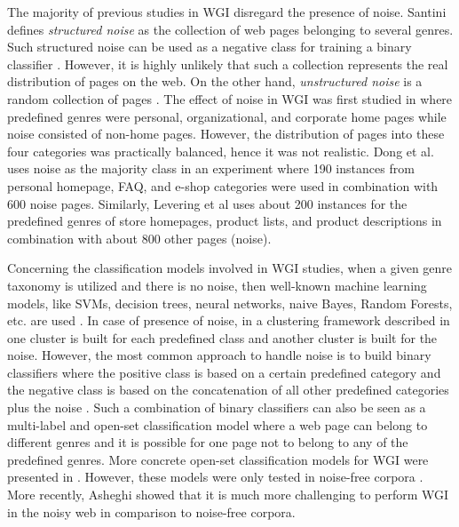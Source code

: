 \documentclass[runningheads]{llncs}
\begin{document}
The majority of previous studies in WGI disregard the presence of noise. Santini \citep{santini2011cross} defines \textit{structured noise} as the collection of web pages belonging to several genres. Such structured noise can be used as a negative class for training a binary classifier \citep{Vidulin2007}. However, it is highly unlikely that such a collection represents the real distribution of pages on the web. On the other hand, \textit{unstructured noise} is a random collection of pages \citep{santini2011cross}. The effect of noise in WGI was first studied in \citep{shepherd2004cybergenre,kennedy2005automatic} where predefined genres were personal, organizational, and corporate home pages while noise consisted of non-home pages. However, the distribution of pages into these four categories was practically balanced, hence it was not realistic. Dong et al.\citep{dong2006binary} uses noise as the majority class in an experiment where 190 instances from personal homepage, FAQ, and e-shop categories were used in combination with 600 noise pages. Similarly, Levering et al \citep{levering2008using} uses about 200 instances for the predefined genres of store homepages, product lists, and product descriptions in combination with about 800 other pages (noise).

Concerning the classification models involved in WGI studies, when a given genre taxonomy is utilized and there is no noise, then well-known machine learning models, like SVMs, decision trees, neural networks, naive Bayes, Random Forests, etc. are used \citep{Lim2005,santini2007automatic,kanaris2009learning,jebari2015combination,sharoff2010web}. In case of presence of noise, in a clustering framework described in \citep{kennedy2005automatic} one cluster is built for each predefined class and another cluster is built for the noise. However, the most common approach to handle noise is to build binary classifiers where the positive class is based on a certain predefined category and the negative class is based on the concatenation of all other predefined categories plus the noise \citep{kennedy2005automatic,dong2006binary,levering2008using}. Such a combination of binary classifiers can also be seen as a multi-label and open-set classification model where a web page can belong to different genres and it is possible for one page not to belong to any of the predefined genres. More concrete open-set classification models for WGI were presented in \citep{stubbe2007genre,pritsos2013open}. However, these models were only tested in noise-free corpora \citep{pritsos2015clef}. More recently, Asheghi \citep{Asheghi2015} showed that it is much more challenging to perform WGI in the noisy web in comparison to noise-free corpora.
\end{document}
